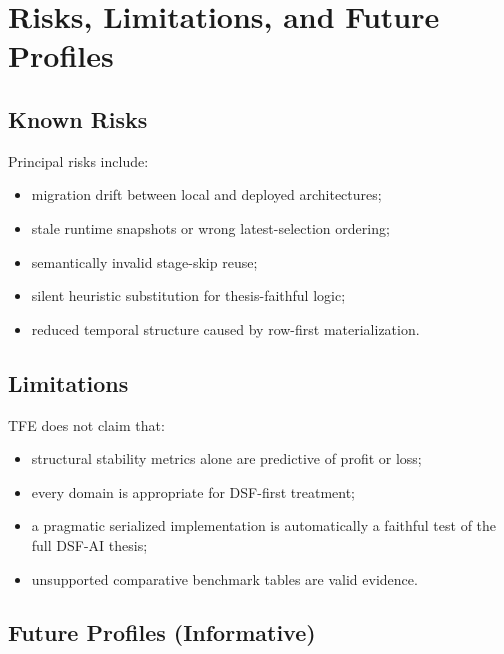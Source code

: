 \chapter{Risks, Limitations, and Future Profiles}
\section{Known Risks}

Principal risks include:
\begin{itemize}
    \item migration drift between local and deployed architectures;
    \item stale runtime snapshots or wrong latest-selection ordering;
    \item semantically invalid stage-skip reuse;
    \item silent heuristic substitution for thesis-faithful logic;
    \item reduced temporal structure caused by row-first materialization.
\end{itemize}

\section{Limitations}

TFE does not claim that:
\begin{itemize}
    \item structural stability metrics alone are predictive of profit or loss;
    \item every domain is appropriate for DSF-first treatment;
    \item a pragmatic serialized implementation is automatically a faithful test of the full DSF-AI thesis;
    \item unsupported comparative benchmark tables are valid evidence.
\end{itemize}

\section{Future Profiles (Informative)}


